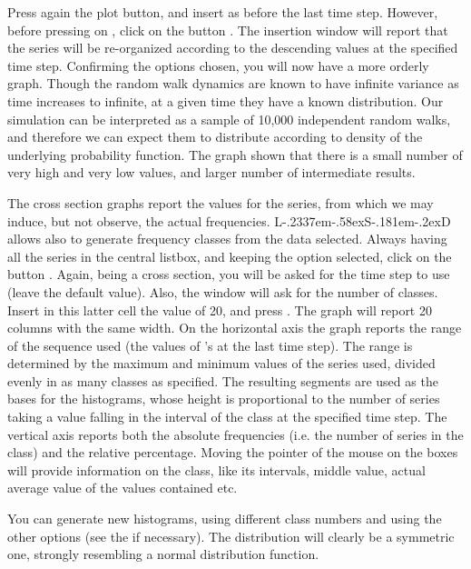 \documentclass [11pt,a4paper] {book}
\def\LsD{{L\kern-.2337em\lower-.58ex\hbox{S}\kern-.181em\lower-.2ex\hbox{D}}\xspace}
\begin{document}
Press again the plot button, and insert as before the last time step. However, before pressing on , click on the button . The insertion window will report that the series will be re-organized according to the descending values at the specified time step. Confirming the options chosen, you will now have a more orderly graph. Though the random walk dynamics are known to have infinite variance as time increases to infinite, at a given time they have a known distribution. Our simulation can be interpreted as a sample of 10,000 independent random walks, and therefore we can expect them to distribute according to density of the underlying probability function. The graph shown that there is a small number of very high and very low values, and larger number of intermediate results.

The cross section graphs report the values for the series, from which we may induce, but not observe, the actual frequencies. \LsD allows also to generate frequency classes from the data selected. Always having all the series in the central listbox, and keeping the option  selected, click on the button . Again, being a cross section, you will be asked for the time step to use (leave the default value). Also, the window will ask for the number of classes. Insert in this latter cell the value of 20, and press . The graph will report 20 columns with the same width. On the horizontal axis the graph reports the range of the sequence used (the values of 's at the last time step). The range is determined by the maximum and minimum values of the series used, divided evenly in as many classes as specified. The resulting segments are used as the bases for the histograms, whose height is proportional to the number of series taking a value falling in the interval of the class at the specified time step. The vertical axis reports both the absolute frequencies (i.e. the number of series in the class) and the relative percentage. Moving the pointer of the mouse on the boxes will provide information on the class, like its intervals, middle value, actual average value of the values contained etc.

You can generate new histograms, using different class numbers and using the other options (see the  if necessary). The distribution will clearly be a symmetric one, strongly resembling a normal distribution function.
\end{document}

